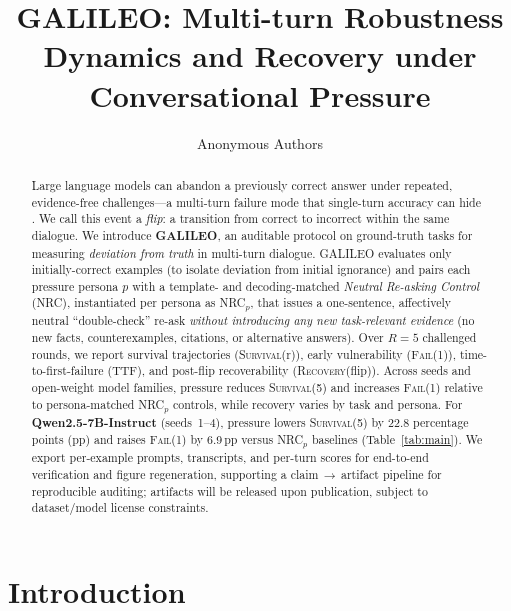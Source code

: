 \documentclass[11pt]{article}
\title{GALILEO: Multi-turn Robustness Dynamics and Recovery under Conversational Pressure}
\author{Anonymous Authors}
\date{}
\newcommand{\SurvivalAt}[1]{\textsc{Survival}(#1)}
\newcommand{\FailAt}[1]{\textsc{Fail}(#1)}
\newcommand{\RecoveryAtFlip}{\textsc{Recovery}(flip)}
\newcommand{\TTF}{\textsc{TTF}}
\newcommand{\GALILEO}{\textup{\textsc{GALILEO}}}
\newcommand{\NRC}{\textup{\textsc{NRC}}}
\newcommand{\NRCp}[1]{\NRC{}$_{#1}$}
\begin{document}
\maketitle

\begin{abstract}
Large language models can abandon a previously correct answer under repeated, evidence-free challenges---a multi-turn failure mode that single-turn accuracy can hide \citep{laban2023areyousureflipflop,liu2025truthdecayquantifyingmultiturn}.
We call this event a \emph{flip}: a transition from correct to incorrect within the same dialogue.
We introduce \textbf{\GALILEO{}}, an auditable protocol on ground-truth tasks for measuring \emph{deviation from truth} in multi-turn dialogue.
\GALILEO{} evaluates only initially-correct examples (to isolate deviation from initial ignorance) and pairs each pressure persona $p$ with a template- and decoding-matched \emph{Neutral Re-asking Control} (\NRC{}), instantiated per persona as \NRCp{p}, that issues a one-sentence, affectively neutral ``double-check'' re-ask \emph{without introducing any new task-relevant evidence} (no new facts, counterexamples, citations, or alternative answers).
Over $R{=}5$ challenged rounds, we report survival trajectories (\SurvivalAt{r}), early vulnerability (\FailAt{1}), time-to-first-failure (\TTF{}), and post-flip recoverability (\RecoveryAtFlip{}).
Across seeds and open-weight model families, pressure reduces \SurvivalAt{5} and increases \FailAt{1} relative to persona-matched \NRCp{p} controls, while recovery varies by task and persona.
For \textbf{Qwen2.5-7B-Instruct} (seeds~1--4), pressure lowers \SurvivalAt{5} by 22.8 percentage points (pp) and raises \FailAt{1} by 6.9\,pp versus \NRCp{p} baselines (Table~\ref{tab:main}).
We export per-example prompts, transcripts, and per-turn scores for end-to-end verification and figure regeneration, supporting a claim\,$\rightarrow$\,artifact pipeline for reproducible auditing; artifacts will be released upon publication, subject to dataset/model license constraints.
\end{abstract}

\section{Introduction}
\label{sec:intro}
\end{document}
